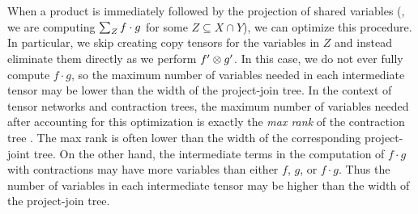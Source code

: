 When a product is immediately followed by the projection of shared variables (\ie, we are computing $\sum_Z f \cdot g$ for some $Z \subseteq X \cap Y$), we can optimize this procedure.
In particular, we skip creating copy tensors for the variables in $Z$ and instead eliminate them directly as we perform $f' \otimes g'$.
In this case, we do not ever fully compute $f \cdot g$, so the maximum number of variables needed in each intermediate tensor may be lower than the width of the project-join tree.
In the context of tensor networks and contraction trees, the maximum number of variables needed after accounting for this optimization is exactly the \emph{max rank} of the contraction tree \cite{KCMR18}.
The max rank is often lower than the width of the corresponding project-joint tree.
On the other hand, the intermediate terms in the computation of $f \cdot g$ with contractions may have more variables than either $f$, $g$, or $f \cdot g$.
Thus the number of variables in each intermediate tensor may be higher than the width of the project-join tree.
